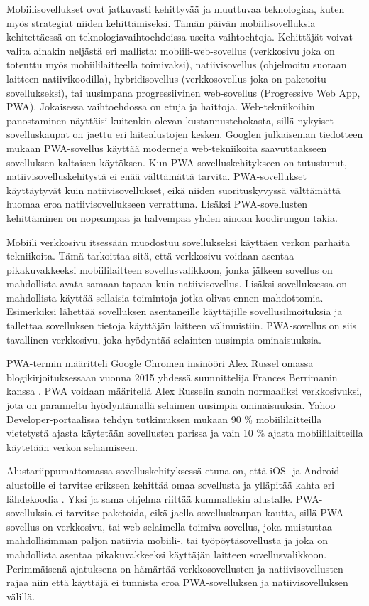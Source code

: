 \documentclass{tktltiki}
\begin{document}
Mobiilisovellukset ovat jatkuvasti kehittyvää ja muuttuvaa teknologiaa, kuten myös strategiat niiden kehittämiseksi. Tämän päivän mobiilisovelluksia kehitettäessä on teknologiavaihtoehdoissa useita vaihtoehtoja. Kehittäjät voivat valita ainakin neljästä eri mallista: mobiili-web-sovellus (verkkosivu joka on toteuttu myös mobiililaitteella toimivaksi), natiivisovellus (ohjelmoitu suoraan laitteen natiivikoodilla), hybridisovellus (verkkosovellus joka on paketoitu sovellukseksi), tai uusimpana progressiivinen web-sovellus (Progressive Web App, PWA). Jokaisessa vaihtoehdossa on etuja ja haittoja. Web-tekniikoihin panostaminen näyttäisi kuitenkin olevan kustannustehokasta, sillä nykyiset sovelluskaupat on jaettu eri laitealustojen kesken. Googlen julkaiseman tiedotteen mukaan \cite{Gambhir} PWA-sovellus käyttää moderneja web-tekniikoita saavuttaakseen sovelluksen kaltaisen käytöksen. Kun PWA-sovelluskehitykseen on tutustunut, natiivisovelluskehitystä ei enää välttämättä tarvita. PWA-sovellukset käyttäytyvät kuin natiivisovellukset, eikä niiden suorituskyvyssä välttämättä huomaa eroa natiivisovellukseen verrattuna. Lisäksi PWA-sovellusten kehittäminen on nopeampaa ja halvempaa yhden ainoan koodirungon takia. 

Mobiili verkkosivu itsessään muodostuu sovellukseksi käyttäen verkon parhaita tekniikoita. Tämä tarkoittaa sitä, että verkkosivu voidaan asentaa pikakuvakkeeksi mobiililaitteen sovellusvalikkoon, jonka jälkeen sovellus on mahdollista avata samaan tapaan kuin natiivisovellus. Lisäksi sovelluksessa on mahdollista käyttää sellaisia toimintoja jotka olivat ennen mahdottomia. Esimerkiksi lähettää sovelluksen asentaneille käyttäjille sovellusilmoituksia ja tallettaa sovelluksen tietoja käyttäjän laitteen välimuistiin. PWA-sovellus on siis tavallinen verkkosivu, joka hyödyntää selainten uusimpia ominaisuuksia.

PWA-termin määritteli Google Chromen insinööri Alex Russel \cite{Russell, biorn2017progressive} omassa blogikirjoituksessaan vuonna 2015 yhdessä suunnittelija Frances Berrimanin kanssa \cite{tandelimpact}. PWA voidaan määritellä Alex Russelin sanoin normaaliksi verkkosivuksi, jota on paranneltu hyödyntämällä selaimen uusimpia ominaisuuksia. Yahoo Developer-portaalissa tehdyn tutkimuksen mukaan \cite{Khalaf} 90 \% mobiililaitteilla vietetystä ajasta käytetään sovellusten parissa ja vain 10 \% ajasta mobiililaitteilla käytetään verkon selaamiseen. 

Alustariippumattomassa sovelluskehityksessä etuna on, että iOS- ja Android-alustoille ei tarvitse erikseen kehittää omaa sovellusta ja ylläpitää kahta eri lähdekoodia \cite{xanthopoulos2013comparative}. Yksi ja sama ohjelma riittää kummallekin alustalle. PWA-sovelluksia ei tarvitse paketoida, eikä jaella sovelluskaupan kautta, sillä PWA-sovellus on verkkosivu, tai web-selaimella toimiva sovellus, joka muistuttaa mahdollisimman paljon natiivia mobiili-, tai työpöytäsovellusta ja joka on mahdollista asentaa pikakuvakkeeksi käyttäjän laitteen sovellusvalikkoon. Perimmäisenä ajatuksena on hämärtää verkkosovellusten ja natiivisovellusten rajaa niin että käyttäjä ei tunnista eroa PWA-sovelluksen ja natiivisovelluksen välillä.
\end{document}
